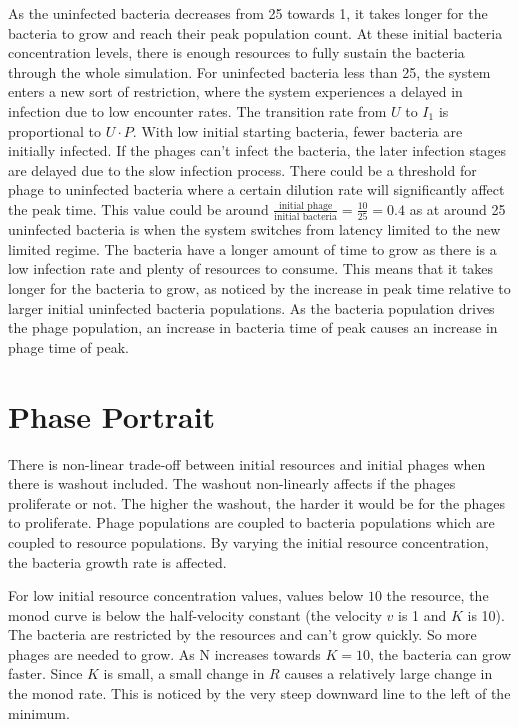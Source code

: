 As the uninfected bacteria decreases from 25 towards 1, it takes longer for the bacteria to grow and reach their peak population count. 
At these initial bacteria concentration levels, there is enough resources to fully sustain the bacteria through the whole simulation. 
For uninfected bacteria less than 25, the system enters a new sort of restriction, where the system experiences a delayed in infection due to low encounter rates. 
The transition rate from $U$ to $I_1$ is proportional to $U\cdot P$. 
With low initial starting bacteria, fewer bacteria are initially infected. 
If the phages can't infect the bacteria, the later infection stages are delayed due to the slow infection process. 
There could be a threshold for phage to uninfected bacteria where a certain dilution rate will significantly affect the peak time. 
This value could be around $\frac{\text{initial phage}}{\text{initial bacteria}} = \frac{10}{25} = 0.4$ as at around 25 uninfected bacteria is when the system switches from latency limited to the new limited regime. 
The bacteria have a longer amount of time to grow as there is a low infection rate and plenty of resources to consume. 
This means that it takes longer for the bacteria to grow, as noticed by the increase in peak time relative to larger initial uninfected bacteria populations. 
As the bacteria population drives the phage population, an increase in bacteria time of peak causes an increase in phage time of peak. 

\section{Phase Portrait}
There is non-linear trade-off between initial resources and initial phages when there is washout included. 
The washout non-linearly affects if the phages proliferate or not. 
The higher the washout, the harder it would be for the phages to proliferate. 
Phage populations are coupled to bacteria populations which are coupled to resource populations. 
By varying the initial resource concentration, the bacteria growth rate is affected. 

For low initial resource concentration values, values below $10$ the resource, the monod curve is below the half-velocity constant (the velocity $v$ is 1 and $K$ is 10). 
The bacteria are restricted by the resources and can't grow quickly. 
So more phages are needed to grow. 
As N increases towards $K=10$, the bacteria can grow faster. 
Since $K$ is small, a small change in $R$ causes a relatively large change in the monod rate. 
This is noticed by the very steep downward line to the left of the minimum. 

